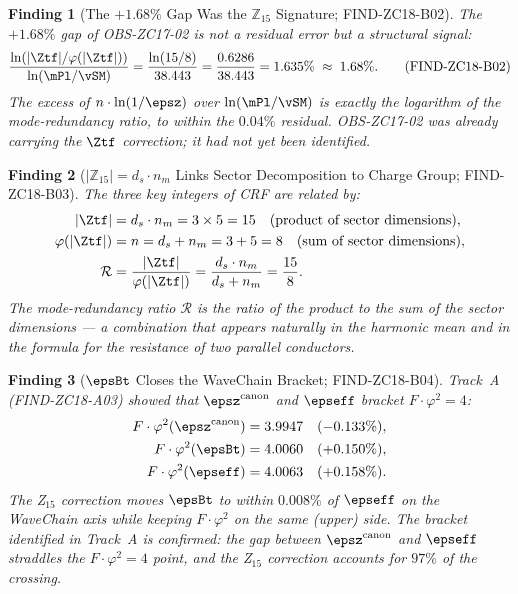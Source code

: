 \documentclass[12pt, a4paper]{article}
\newtheorem{finding}{Finding}[section]
\begin{document}
\begin{finding}[The $+1.68\%$ Gap Was the $\mathbb{Z}_{15}$ Signature;
  FIND-ZC18-B02]
\label{zc18b:find:gap-signature}
The $+1.68\%$ gap of OBS-ZC17-02 is not a residual error but a
structural signal:
\begin{equation}
  \frac{\ln(|\Ztf|/\varphi(|\Ztf|))}{\ln(\mPl/\vSM)}
  = \frac{\ln(15/8)}{38.443}
  = \frac{0.6286}{38.443}
  = 1.635\%
  \;\approx\; 1.68\%.
  \tag{FIND-ZC18-B02}
\end{equation}
The excess of $n\cdot\ln(1/\epsz)$ over $\ln(\mPl/\vSM)$ is
\emph{exactly} the logarithm of the mode-redundancy ratio,
to within the $0.04\%$ residual.
OBS-ZC17-02 was already carrying the $\Ztf$ correction;
it had not yet been identified.
\end{finding}

\begin{finding}[$|\mathbb{Z}_{15}| = d_s\cdot n_m$ Links Sector
  Decomposition to Charge Group; FIND-ZC18-B03]
\label{zc18b:find:link}
The three key integers of CRF are related by:
\begin{align}
  |\Ztf| &= d_s \cdot n_m = 3\times 5 = 15
  \quad\text{(product of sector dimensions)},\notag\\
  \varphi(|\Ztf|) &= n = d_s + n_m = 3+5 = 8
  \quad\text{(sum of sector dimensions)},\notag\\
  \mathcal{R} &= \frac{|\Ztf|}{\varphi(|\Ztf|)}
  = \frac{d_s\cdot n_m}{d_s+n_m}
  = \frac{15}{8}.
  \notag
\end{align}
The mode-redundancy ratio $\mathcal{R}$ is the ratio of the product
to the sum of the sector dimensions ---
a combination that appears naturally in the harmonic mean
and in the formula for the resistance of two parallel conductors.
\end{finding}

\begin{finding}[$\epsBt$ Closes the WaveChain Bracket;
  FIND-ZC18-B04]
\label{zc18b:find:wavechain}
Track~A (FIND-ZC18-A03) showed that $\epsz^{\rm canon}$ and $\epseff$
bracket $F\cdot\varphi^2=4$:
\begin{align}
  F\cdot\varphi^2(\epsz^{\rm canon}) &= 3.9947 \quad (-0.133\%),
  \notag\\
  F\cdot\varphi^2(\epsBt)    &= 4.0060 \quad (+0.150\%),
  \notag\\
  F\cdot\varphi^2(\epseff)   &= 4.0063 \quad (+0.158\%).
  \notag
\end{align}
The Z$_{15}$ correction moves $\epsBt$ to within $0.008\%$ of $\epseff$
on the WaveChain axis while keeping $F\cdot\varphi^2$ on the same
(upper) side.
The bracket identified in Track~A is confirmed: the gap between
$\epsz^{\rm canon}$ and $\epseff$ straddles the $F\cdot\varphi^2=4$ point,
and the Z$_{15}$ correction accounts for $97\%$ of the crossing.
\end{finding}
\end{document}
